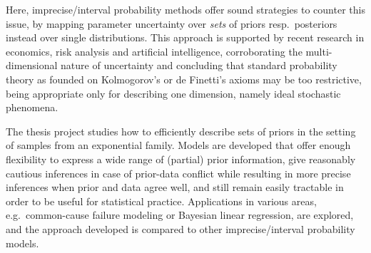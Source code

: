 Here, imprecise/interval probability methods offer sound strategies to counter this issue,
by mapping parameter uncertainty over \emph{sets} of priors resp.\ posteriors instead over single distributions.
This approach is supported by recent research in economics, risk analysis and artificial intelligence,
corroborating the multi-dimensional nature of uncertainty and concluding that standard probability theory
as founded on Kolmogorov's or de Finetti's axioms may be too restrictive,
being appropriate only for describing one dimension, namely ideal stochastic phenomena.

The thesis project studies how to efficiently describe sets of priors in the setting of samples from an exponential family. 
Models are developed that offer enough flexibility to express a wide range of (partial) prior information,
give reasonably cautious inferences in case of prior-data conflict while resulting in more precise inferences when prior and data agree well,
and still remain easily tractable in order to be useful for statistical practice.
Applications in various areas, e.g.\ common-cause failure modeling or Bayesian linear regression, are explored,
and the approach developed is compared to other imprecise/interval probability models.
